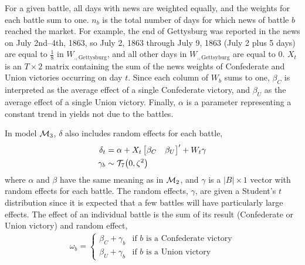 For a given battle, all days with news are weighted equally, and the weights for each battle sum to one.
$n_{b}$ is the total number of days for which news of battle $b$ reached the market.
For example, the end of Gettysburg was reported in the news on July 2nd--4th, 1863, so July 2, 1863 through July 9, 1863 (July 2 plus 5 days) are equal to $\frac{1}{8}$ in $W_{.,\text{Gettysburg}}$, and all other days in $W_{.,\text{Gettsyburg}}$ are equal to 0.
$X_{t}$ is an $T \times 2$ matrix containing the sum of the news weights of Confederate and Union victories occurring on day $t$. 
Since each column of $W_{b}$ sums to one, $\beta_{C}$ is interpreted as the average effect of a single Confederate victory, and $\beta_{U}$ as the average effect of a single Union victory.
Finally, $\alpha$ is a parameter representing a constant trend in yields not due to the battles.

In model $\mathcal{M}_{\text{3}}$, $\delta$ also includes random effects for each battle,
\begin{align}
  \label{bonds:eq:10}
  \delta_{t} &= \alpha + X_{t} \begin{bmatrix}\beta_{C} & \beta_{U}\end{bmatrix}' + W_{t} \gamma \\
  \label{bonds:eq:12}
  \gamma_{b} &\sim \mathcal{T}_{7}\mathopen{}\left(0, \zeta^{2}\right)\mathclose{}
\end{align}
where $\alpha$ and $\beta$ have the same meaning as in $\mathcal{M}_{\text{2}}$, and $\gamma$ is a $|B| \times 1$ vector with random effects for each battle.
The random effects, $\gamma$, are given a Student's $t$ distribution since it is expected that a few battles will have particularly large effects.
The effect of an individual battle is the sum of its result (Confederate or Union victory) and random effect,
\begin{align}
  \omega_{b} =
  \begin{cases}
    \beta_{C} + \gamma_{b} & \text{if $b$ is a Confederate victory} \\
    \beta_{U} + \gamma_{b} & \text{if $b$ is a Union victory}
  \end{cases}
\end{align}

